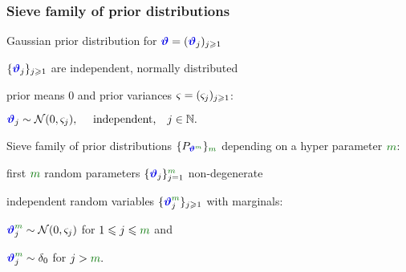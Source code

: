 %                                                                 
%

\frametitle{Sieve family of prior distributions}
\begin{overlayarea}{\textwidth}{\textheight}
\begin{rudiListeS}[\setListeL{3ex}{2ex}{5ex}{5ex}] 
 \item<1-> Gaussian prior distribution for $\RvSo=\suite{\RvSo}$
\begin{rudiListeT}[\setListeL{1ex}{1ex}{3ex}{0ex}] 
  \item<2-> $\{\RvSo_j\}_{j\geq1}$ are independent, normally distributed
  \item<3-> prior means $0$ and prior variances $\varsigma=(\varsigma_j)_{j \geqslant 1}$:
\begin{rudiListeB}[\setListeL{1ex}{1ex}{3ex}{5ex}] 
\item<4-> $\RvSo_j\sim\cN(0,\RvSoVa_j),\quad \text{ independent,}\quad j\in\Nz.$
\end{rudiListeB}
\end{rudiListeT}
\item<5-> Sieve family of prior distributions  $\{P_{\DiRvSo}\}_{\Di}$ depending on a hyper parameter $\Di$:
\begin{rudiListeT}[\setListeL{1ex}{1ex}{3ex}{0ex}] 
\item<6-> first $\Di$ random parameters $\{\RvSo_j\}_{j=1}^{\colmm}$ non-degenerate
\item<7-> independent random variables $\{\DiRvSo_j\}_{j\geq1}$
with marginals:
\begin{rudiListeB}[\setListeL{1ex}{1ex}{3ex}{0ex}] 
\item<8-> $\label{intro:def:prior:mrvSo}
\DiRvSo_j\sim
\cN(0,\RvSoVa_j)$ for  $1\leq j\leq \Di$  and 
\item<9-> $\DiRvSo_j\sim\delta_{0}$ for $j>\Di.$
\end{rudiListeB}
\end{rudiListeT}
\end{rudiListeS}
\end{overlayarea}
